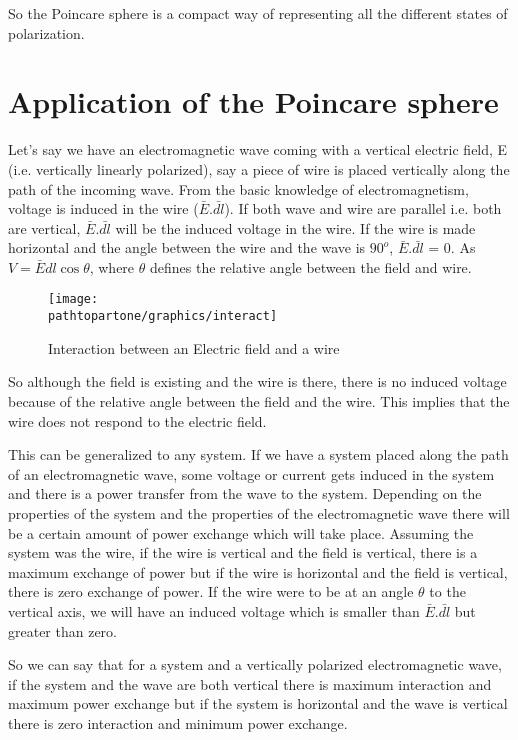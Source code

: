 So the Poincare sphere is a compact way of representing all the different states of polarization.

\section{Application of the Poincare sphere}
Let's say we have an electromagnetic wave coming with a vertical electric field, E (i.e. vertically linearly polarized), say a piece of wire is placed vertically along the path of the incoming wave. From the basic knowledge of electromagnetism, voltage is induced in the wire ($\bar{E}$.$\bar{dl}$). If both wave and wire are parallel i.e. both are vertical, $\bar{E}$.$\bar{dl}$ will be the induced voltage in the wire. If the wire is made horizontal and the angle between the wire and the wave is $90^{o}$, $\bar{E}$.$\bar{dl}$ = 0. As $ V = \bar{E}dl\cos\theta $, where $ \theta $ defines the relative angle between the field and wire.
\begin{figure}[h]
\centering
\texttt{[image: \\pathtopartone/graphics/interact]}
\caption{Interaction between an Electric field and a wire}
\label{fig:interact}
\end{figure}

So although the field is existing and the wire is there, there is no induced voltage because of the relative angle between the field and the wire. This implies that the wire does not respond to the electric field.

This can be generalized to any system. If we have a system placed along the path of an electromagnetic wave, some voltage or current gets induced in the system and there is a power transfer from the wave to the system. Depending on the properties of the system and the properties of the electromagnetic wave there will be a certain amount of power exchange which will take place. Assuming the system was the wire, if the wire is vertical and the field is vertical, there is a maximum exchange of power but if the wire is horizontal and the field is vertical, there is zero exchange of power. If the wire were to be at an angle $\theta$ to the vertical axis, we will have an induced voltage which is smaller than $\bar{E}$.$\bar{dl}$ but greater than zero.

So we can say that for a system and a vertically polarized electromagnetic wave, if the system and the wave are both vertical there is maximum interaction and maximum power exchange but if the system is horizontal and the wave is vertical there is zero interaction and minimum power exchange.

